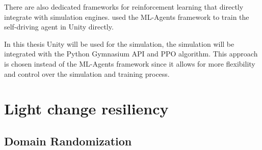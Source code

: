 There are also dedicated frameworks for reinforcement learning that directly integrate with simulation engines. \autocite{maximilian} used the ML-Agents framework \autocite{mlagents} to train the self-driving agent in Unity directly.

In this thesis Unity will be used for the simulation, the simulation will be integrated with the Python Gymnasium API and PPO algorithm. This approach is chosen instead of the ML-Agents framework since it allows for more flexibility and control over the simulation and training process.














\section{Light change resiliency}

\subsection{Domain Randomization}

